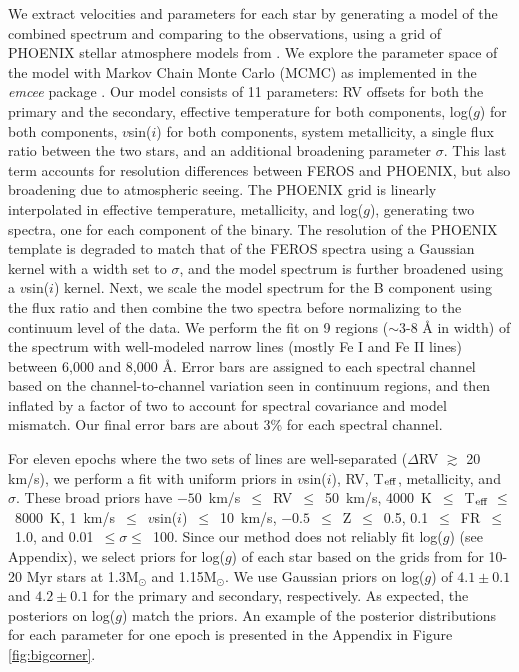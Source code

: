 \documentclass[]{aastex701} %
\begin{document}
 We extract velocities and parameters for each star by generating a model of the combined spectrum and comparing to the observations, using a grid of PHOENIX stellar atmosphere models \citep{hauschildt:1999} from \citet{Husser2013}. We explore the parameter space of the model with Markov Chain Monte Carlo (MCMC) as implemented in the \textit{emcee} package \citep{emcee}. Our model consists of 11 parameters: RV offsets for both the primary and the secondary, effective temperature for both components, log($g$) for both components, $v$sin($i$) for both components, system metallicity, a single flux ratio between the two stars, and an additional broadening parameter $\sigma$. This last term accounts for resolution differences between FEROS and PHOENIX, but also broadening due to atmospheric seeing. The PHOENIX grid is linearly interpolated in effective temperature, metallicity, and log($g$), generating two spectra, one for each component of the binary. The resolution of the PHOENIX template is degraded to match that of the FEROS spectra using a Gaussian kernel with a width set to $\sigma$, and the model spectrum is further broadened using a $v$sin($i$) kernel. Next, we scale the model spectrum for the B component using the flux ratio and then combine the two spectra before normalizing to the continuum level of the data. We perform the fit on 9 regions ($\sim$3-8 \r{A} in width) of the spectrum with well-modeled narrow lines (mostly Fe I and Fe II lines) between 6,000 and 8,000 \r{A}. Error bars are assigned to each spectral channel based on the channel-to-channel variation seen in continuum regions, and then inflated by a factor of two to account for spectral covariance and model mismatch. Our final error bars are about 3\% for each spectral channel.
 
 For eleven epochs where the two sets of lines are well-separated ($\Delta$RV $\gtrsim$ 20 km/s), we perform a fit with uniform priors in $v$sin($i$), RV, T$_{\rm eff}$, metallicity, and $\sigma$. These broad priors have $-50$~km/s~$\le$~RV~$\le$~50~km/s, 4000~K~$\le$~T$_{\rm eff}~\le$~8000~K, 1~km/s~$\le$~$v$sin($i$)~$\le$~10~km/s, $-0.5$~$\le$~Z~$\le$~0.5, 0.1~$\le$~FR~$\le$~1.0, and 0.01~$\le\sigma\le$~100. Since our method does not reliably fit log($g$) (see Appendix), we select priors for log($g$) of each star based on the grids from \citet{Baraffe:2015} for 10-20 Myr stars at 1.3M$_\odot$ and 1.15M$_\odot$. We use Gaussian priors on log($g$) of $4.1 \pm 0.1$ and $4.2 \pm 0.1$ for the primary and secondary, respectively. As expected, the posteriors on log($g$) match the priors. An example of the posterior distributions for each parameter for one epoch is presented in the Appendix in Figure \ref{fig:bigcorner}.
 
\end{document}
